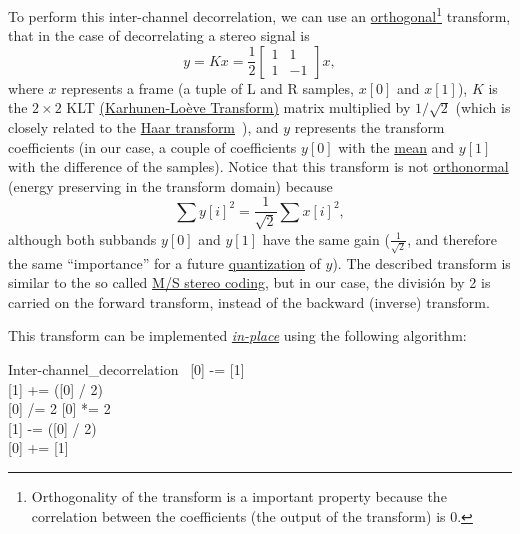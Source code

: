 To perform this inter-channel decorrelation, we can use an
\href{https://en.wikipedia.org/wiki/Orthogonal_transformation}{orthogonal}\footnote{Orthogonality
  of the transform is a important property because the correlation
  between the coefficients (the output of the transform) is 0.}
transform, that in the case of decorrelating a stereo signal is
\begin{equation}
  y = Kx = \frac{1}{2}\begin{bmatrix} 1 & 1 \\ 1 & -1 \end{bmatrix}x,
\end{equation}
where $x$ represents a frame (a tuple of L and R samples, $x[0]$ and
$x[1]$), $K$ is the $2\times 2$ KLT
\href{http://fourier.eng.hmc.edu/e161/lectures/klt/node3.html}{(Karhunen-Lo\`eve
  Transform)} matrix multiplied by $1/\sqrt{2}$ (which is closely
related to the \href{http://wavelets.pybytes.com/wavelet/haar/}{Haar
  transform}~\cite{vetterli1995wavelets}), and $y$ represents the
transform coefficients (in our case, a couple of coefficients $y[0]$
with the \href{https://en.wikipedia.org/wiki/Arithmetic_mean}{mean}
and $y[1]$ with the difference of the samples). Notice that this
transform is not
\href{https://en.wikipedia.org/wiki/Orthonormal_basis}{orthonormal}
(energy preserving in the transform domain) because
\begin{equation}
  \sum y[i]^2 = \frac{1}{\sqrt{2}}\sum x[i]^2,
\end{equation}
although both subbands $y[0]$ and $y[1]$ have the same gain
($\frac{1}{\sqrt{2}}$, and therefore the same ``importance'' for a
future
\href{https://en.wikipedia.org/wiki/Quantization_(signal_processing)}{quantization}
of $y$). The described transform is similar to the so called
\href{https://en.wikipedia.org/wiki/Joint_encoding#M/S_stereo_coding}{M/S
  stereo coding}, but in our case, the división by 2 is carried on
the forward transform, instead of the backward (inverse) transform.

This transform can be implemented
\href{https://en.wikipedia.org/wiki/In-place_algorithm}{\emph{in-place}}
using the following algorithm:

\begin{pseudocode}{Inter-channel\_decorrelation}{~}
  \BEGIN
    [0] -= [1] \\
    [1] += ([0] / 2) \\
    [0] /= 2
  \END
  \ENDPROCEDURE
  \BEGIN
    [0] *= 2 \\
    [1] -= ([0] / 2) \\
    [0] += [1]
  \END
  \ENDPROCEDURE
\end{pseudocode}

